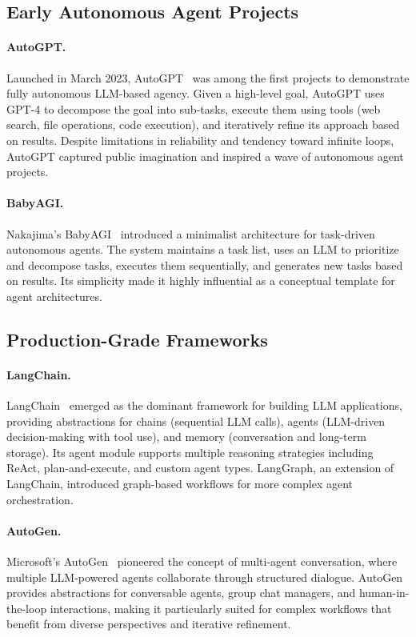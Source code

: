 \documentclass[11pt,a4paper]{article}
\begin{document}
\subsection{Early Autonomous Agent Projects}

\paragraph{AutoGPT.} Launched in March 2023, AutoGPT~\citep{autogpt2023} was among the first projects to demonstrate fully autonomous LLM-based agency. Given a high-level goal, AutoGPT uses GPT-4 to decompose the goal into sub-tasks, execute them using tools (web search, file operations, code execution), and iteratively refine its approach based on results. Despite limitations in reliability and tendency toward infinite loops, AutoGPT captured public imagination and inspired a wave of autonomous agent projects.

\paragraph{BabyAGI.} Nakajima's BabyAGI~\citep{babyagi2023} introduced a minimalist architecture for task-driven autonomous agents. The system maintains a task list, uses an LLM to prioritize and decompose tasks, executes them sequentially, and generates new tasks based on results. Its simplicity made it highly influential as a conceptual template for agent architectures.

\subsection{Production-Grade Frameworks}

\paragraph{LangChain.} LangChain~\citep{chase2022langchain} emerged as the dominant framework for building LLM applications, providing abstractions for chains (sequential LLM calls), agents (LLM-driven decision-making with tool use), and memory (conversation and long-term storage). Its agent module supports multiple reasoning strategies including ReAct, plan-and-execute, and custom agent types. LangGraph, an extension of LangChain, introduced graph-based workflows for more complex agent orchestration.

\paragraph{AutoGen.} Microsoft's AutoGen~\citep{wu2023autogen} pioneered the concept of multi-agent conversation, where multiple LLM-powered agents collaborate through structured dialogue. AutoGen provides abstractions for conversable agents, group chat managers, and human-in-the-loop interactions, making it particularly suited for complex workflows that benefit from diverse perspectives and iterative refinement.
\end{document}
